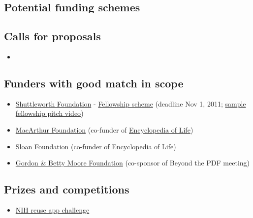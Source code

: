 \documentclass[final,authoryear,3p]{elsarticle-open-drafting}
\begin{document}
\begin{enumerate}
\section{Potential funding schemes}
\subsection{Calls for proposals}
\begin{itemize}
	\item 
\end{itemize}
\subsection{Funders with good match in scope}
\begin{itemize}
	\item \href{http://www.shuttleworthfoundation.org/}{Shuttleworth Foundation} - \href{http://www.shuttleworthfoundation.org/funding/fellowship-programme/}{Fellowship scheme} (deadline Nov 1, 2011; \href{http://vimeo.com/10401282}{sample fellowship pitch video})
	\item \href{http://www.macfound.org}{MacArthur Foundation} (co-funder of \href{http://www.eol.org/}{Encyclopedia of Life})
	\item \href{http://www.sloan.org/}{Sloan Foundation} (co-funder of \href{http://www.eol.org/}{Encyclopedia of Life})
	\item \href{http://www.moore.org/}{Gordon \& Betty Moore Foundation} (co-sponsor of Beyond the PDF meeting)
\end{itemize}
\subsection{Prizes and competitions}
\begin{itemize}
	\item \href{http://challenge.gov/NIH/132-nlm-show-off-your-apps-innovative-uses-of-nlm-information}{NIH reuse app challenge}
\end{itemize}


\end{enumerate}
\end{document}
